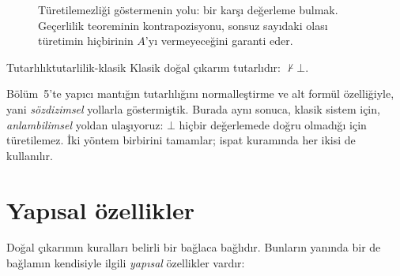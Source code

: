 \begin{figure}[htbp]
\centering
{}
\caption{Türetilemezliği göstermenin yolu: bir karşı değerleme bulmak.
Geçerlilik teoreminin kontrapozisyonu, sonsuz sayıdaki olası türetimin
hiçbirinin $A$'yı vermeyeceğini garanti eder.}
\label{fig:karsi-model}
\end{figure}

\begin{teorem}{Tutarlılık}{tutarlilik-klasik}
Klasik doğal çıkarım tutarlıdır: $\nvdash \bot$.
\end{teorem}

\noindent Bölüm~5'te yapıcı mantığın tutarlılığını normalleştirme ve alt
formül özelliğiyle, yani \emph{sözdizimsel} yollarla göstermiştik. Burada
aynı sonuca, klasik sistem için, \emph{anlambilimsel} yoldan ulaşıyoruz:
$\bot$ hiçbir değerlemede doğru olmadığı için türetilemez. İki yöntem
birbirini tamamlar; ispat kuramında her ikisi de kullanılır.

\section{Yapısal özellikler}\label{sec:yapisal}

Doğal çıkarımın kuralları belirli bir bağlaca bağlıdır. Bunların yanında
bir de bağlamın kendisiyle ilgili \emph{yapısal} özellikler vardır:

